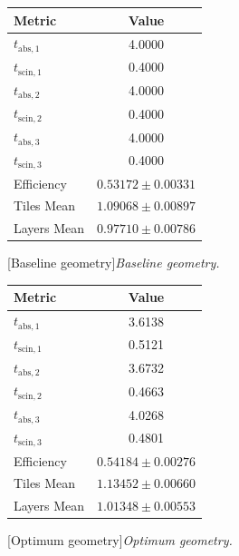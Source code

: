 \begin{center}
    \begin{minipage}[t]{0.47\textwidth}
        \centering
        \begin{tabular}{lc}
            \toprule
            Metric & Value \\
            \midrule
            $t_{\mathrm{abs},1}$ & 4.0000 \\
            $t_{\mathrm{scin},1}$ & 0.4000 \\
            $t_{\mathrm{abs},2}$ & 4.0000 \\
            $t_{\mathrm{scin},2}$ & 0.4000 \\
            $t_{\mathrm{abs},3}$ & 4.0000 \\
            $t_{\mathrm{scin},3}$ & 0.4000 \\
            Efficiency & $0.53172 \pm 0.00331$ \\
            Tiles Mean & $1.09068 \pm 0.00897$ \\
            Layers Mean & $0.97710 \pm 0.00786$ \\
            \bottomrule
        \end{tabular}
        [Baseline geometry]{\it Baseline geometry.}
        \label{tab:baseline_geometry}
    \end{minipage}
    \hfill
    \begin{minipage}[t]{0.47\textwidth}
        \centering
        \begin{tabular}{lc}
            \toprule
            Metric & Value \\
            \midrule
            $t_{\mathrm{abs},1}$ & 3.6138 \\
            $t_{\mathrm{scin},1}$ & 0.5121 \\
            $t_{\mathrm{abs},2}$ & 3.6732 \\
            $t_{\mathrm{scin},2}$ & 0.4663 \\
            $t_{\mathrm{abs},3}$ & 4.0268 \\
            $t_{\mathrm{scin},3}$ & 0.4801 \\
            Efficiency & $0.54184 \pm 0.00276$ \\
            Tiles Mean & $1.13452 \pm 0.00660$ \\
            Layers Mean & $1.01348 \pm 0.00553$ \\
            \bottomrule
        \end{tabular}
        [Optimum geometry]{\it Optimum geometry.}
        \label{tab:optimum_geometry}
    \end{minipage}


\end{center}

